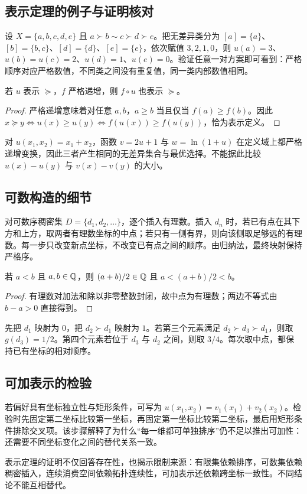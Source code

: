 \subsection{表示定理的例子与证明核对}

\begin{example}[有限序的显式表示]
设 $X=\{a,b,c,d,e\}$ 且 $a\succ b\sim c\succ d\succ e$。把无差异类分为
$[a]=\{a\}$、$[b]=\{b,c\}$、$[d]=\{d\}$、$[e]=\{e\}$，依次赋值 $3,2,1,0$，则
$u(a)=3$、$u(b)=u(c)=2$、$u(d)=1$、$u(e)=0$。验证任意一对方案即可看到：严格顺序对应严格数值，不同类之间没有重复值，同一类内部数值相同。
\end{example}

\begin{proposition}[单调变换保持表示]
若 $u$ 表示 $\succeq$，$f$ 严格递增，则 $f\circ u$ 也表示 $\succeq$。
\end{proposition}
\begin{proof}
严格递增意味着对任意 $a,b$，$a\ge b$ 当且仅当 $f(a)\ge f(b)$。因此
$x\succeq y\Leftrightarrow u(x)\ge u(y)\Leftrightarrow f(u(x))\ge f(u(y))$，恰为表示定义。
\end{proof}

\begin{example}[同一偏好的三种写法]
对 $u(x_1,x_2)=x_1+x_2$，函数 $v=2u+1$ 与 $w=\ln(1+u)$ 在定义域上都严格递增变换，因此三者产生相同的无差异集合与最优选择。不能据此比较 $u(x)-u(y)$ 与 $v(x)-v(y)$ 的大小。
\end{example}

\subsection{可数构造的细节}
对可数序稠密集 $D=\{d_1,d_2,\ldots\}$，逐个插入有理数。插入 $d_n$ 时，若已有点在其下方和上方，取两者有理数坐标的中点；若只有一侧有界，则向该侧取足够远的有理数。每一步只改变新点坐标，不改变已有点之间的顺序。由归纳法，最终映射保持严格序。

\begin{proposition}[中点构造保持序]
若 $a<b$ 且 $a,b\in\mathbb{Q}$，则 $(a+b)/2\in\mathbb{Q}$ 且 $a<(a+b)/2<b$。
\end{proposition}
\begin{proof}
有理数对加法和除以非零整数封闭，故中点为有理数；两边不等式由 $b-a>0$ 直接得到。
\end{proof}

\begin{example}[三次插入]
先把 $d_1$ 映射为 $0$，把 $d_2\succ d_1$ 映射为 $1$。若第三个元素满足 $d_2\succ d_3\succ d_1$，则取 $g(d_3)=1/2$。第四个元素若位于 $d_3$ 与 $d_2$ 之间，则取 $3/4$。每次取中点，都保持已有坐标的相对顺序。
\end{example}

\subsection{可加表示的检验}
若偏好具有坐标独立性与矩形条件，可写为 $u(x_1,x_2)=v_1(x_1)+v_2(x_2)$。检验时先固定第二坐标比较第一坐标，再固定第一坐标比较第二坐标，最后用矩形条件排除交叉项。该步骤解释了为什么“每一维都可单独排序”仍不足以推出可加性：还需要不同坐标变化之间的替代关系一致。

\begin{remark}
表示定理的证明不仅回答存在性，也揭示限制来源：有限集依赖排序，可数集依赖稠密插入，连续消费空间依赖拓扑连续性，可加表示还依赖跨坐标一致性。不同结论不能互相替代。
\end{remark}
